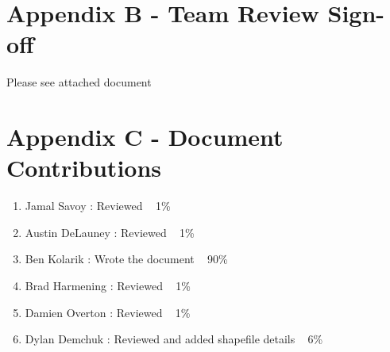 \documentclass{article}
\begin{document}
\section{Appendix B - Team Review Sign-off}
Please see attached document
\pagebreak
\section{Appendix C - Document Contributions}

\vspace{2.5mm}

\begin{addmargin}[2em]{0em}
\begin{enumerate}

\item Jamal Savoy : Reviewed ~ 1\%

\item Austin DeLauney : Reviewed ~ 1\%

\item Ben Kolarik : Wrote the document ~ 90\%

\item Brad Harmening : Reviewed ~ 1\%

\item Damien Overton : Reviewed ~ 1\%

\item Dylan Demchuk : Reviewed and added shapefile details ~ 6\%

\end{enumerate}
\end{addmargin}
\end{document}
